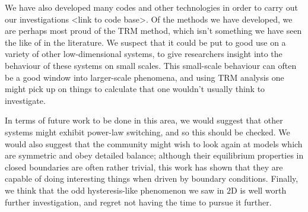 We have also developed many codes and other technologies in order to carry out our investigations 
<link to code base>. Of the methods we have developed, we are perhaps most proud of the TRM method, which
isn't something we have seen the like of in the literature. We suspect that it could be put to good use on a
variety of other low-dimensional systems, to give researchers insight into the behaviour of these systems on 
small scales. This small-scale behaviour can often be a good window into larger-scale phenomena, and using TRM
analysis one might pick up on things to calculate that one wouldn't usually think to investigate.

In terms of future work to be done in this area, we would suggest that other systems might exhibit
power-law switching, and so this should be checked. We would also suggest that the community
might wish to look again at models which are symmetric and obey detailed balance; although their
equilibrium properties in closed boundaries are often rather trivial, this work has shown that they are 
capable of doing interesting things when driven by boundary conditions. Finally, we think that the
odd hysteresis-like phenomenon we saw in $2$D is well worth further investigation, and regret not having the
time to pursue it further.



